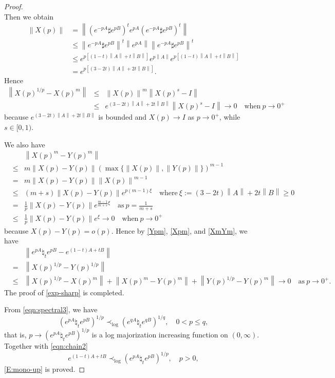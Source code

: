 \documentclass[12pt, reqno]{amsart}
\numberwithin{equation}{section}
\theoremstyle{definition}
\renewcommand{\ge}{\geqslant}
\renewcommand{\le}{\leqslant}
\newcommand\norm[1]{\left\lVert#1\right\rVert}
\newcommand\ui{\| \!!!|}
\def\ui{\|\hspace{-.25mm} |\,}
\begin{document}
\begin{proof}
\[\]
Then we obtain
\[
\begin{split}
\norm{X(p)} &= \norm{(e^{-pA}\sharp e^{pB})^t e^{pA} (e^{-pA}\sharp e^{pB})^t}\\
& \le \norm{e^{-pA}\sharp e^{pB}}^t \norm{e^{pA}} \norm{e^{-pA}\sharp e^{pB}}^t\\
& \le e^{p[(1-t)\norm A+t\norm B]} e^{p\norm{A}} e^{p[(1-t)\norm A+t\norm B]}\\
&= e^{p[(3-2t)\norm{A}+2t\norm{B}]}.
\end{split}
\]
Hence
\begin{eqnarray}
\norm{X(p)^{1/p}-X(p)^m}  &\le &\norm{X(p)}^m\norm{X(p)^s -I} \nonumber\\
&\le &e^{(3-2t)\norm{A}+2t\norm{B}}\norm{X(p)^s -I} \to 0\quad  \text{when}\ p\to 0^+\label{Xpm}
\end{eqnarray}
because $e^{(3-2t)\norm{A}+2t\norm{B}}$ is bounded and $X(p)\to I$ as $ p\to 0^+$, while $s\in[0,1)$.

We also have
\begin{eqnarray}
&&\norm{X(p)^m - Y(p)^m} \nonumber\\
&\le& m\norm{X(p)-Y(p)} \left(\max\{\norm{X(p)}, \norm{Y(p)}\}\right)^{m-1} \nonumber\\
&=& m\norm{X(p)-Y(p)} \norm{X(p)}^{m-1} \nonumber\\
&\le &(m+s)\norm{X(p)-Y(p)} e^{p(m-1)\xi} \quad \text{where} \ \xi :=(3-2t)\norm A + 2t\norm B\ge 0\nonumber\\
&= &\frac{1}{p} \norm{X(p)-Y(p)} e^{\frac {m-1}{m+s}\xi} \quad \text{as} \ p = \frac 1{m+s}\nonumber\\
&\le &\frac{1}{p} \norm{X(p)-Y(p)} e^\xi \to 0\quad  \text{when}\ p\to 0^+\label{XmYm}
\end{eqnarray}
because $X(p)-Y(p) =o(p)$. Hence by  \eqref{Ypm}, \eqref{Xpm}, and \eqref{XmYm}, we have
\begin{eqnarray*}
&& \norm{e^{pA}\natural_t e^{pB}-e^{(1-t)A+tB}}\\
& = & \norm{X(p)^{1/p}-Y(p)^{1/p}}\\
&\le& \norm{X(p)^{1/p}-X(p)^m}   +\norm{X(p)^m - Y(p)^m}+ \norm{Y(p)^{1/p}-Y(p)^m} \to  0 \quad \text{as}\ p\to 0^+.
\end{eqnarray*}
The proof of \eqref{exp-sharp} is completed. 


From \eqref{eqn:spectral3}, we have  $$(e^{pA} \natural_t e^{pB})^{1/p}\prec_{\log} (e^{qA} \natural_t e^{qB})^{1/q},\quad 0<p\le q,
$$
that is, $p\to  (e^{pA} \natural_t e^{pB})^{1/p}$ is a log majorization increasing function on $(0,\infty)$.
Together with \eqref{eqn:chain2}
\[
e^{(1-t)A+tB} \prec_{\log} (e^{pA} \natural_t e^{pB})^{1/p},\quad p> 0,
\]
\eqref{E:mono-up} is proved.
\end{proof}
\end{document}
